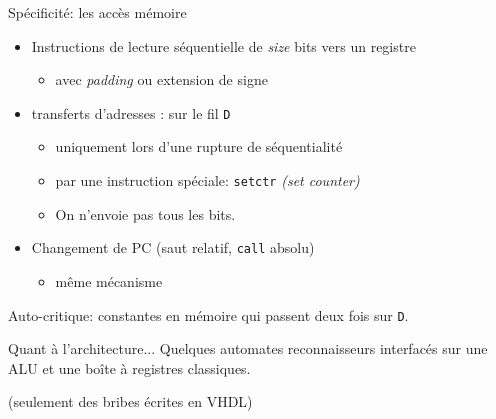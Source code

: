 \documentclass[slidetop,11pt,table]{beamer}
\begin{document}
\begin{frame}{Spécificité: les accès mémoire}
  \begin{figure}[b]
    \begin{center}
      \scalebox{0.5}{\proco}
    \end{center}
  \end{figure}
  \begin{itemize}
  \item Instructions de lecture séquentielle de
    \emph{size} bits vers un registre
    \begin{itemize}
    \item avec \emph{padding} ou extension de signe
    \end{itemize}
    
  \item transferts d'adresses : sur le fil \texttt{D}
    \begin{itemize}
    \item uniquement lors d'une rupture de séquentialité
    \item par une instruction spéciale: \texttt{setctr} \emph{(set counter)}
    \item On n'envoie pas tous les bits.
    \end{itemize}
  \item Changement de PC (saut relatif, \texttt{call} absolu)
    \begin{itemize}
    \item même mécanisme
    \end{itemize}
  \end{itemize}
  Auto-critique: constantes en mémoire qui passent deux fois sur \texttt{D}.
\end{frame}



\begin{frame}{Quant à l'architecture...}
  Quelques automates reconnaisseurs interfacés sur une ALU et une boîte à registres classiques. 
  
  (seulement des bribes écrites en VHDL)

\end{frame}
\end{document}
